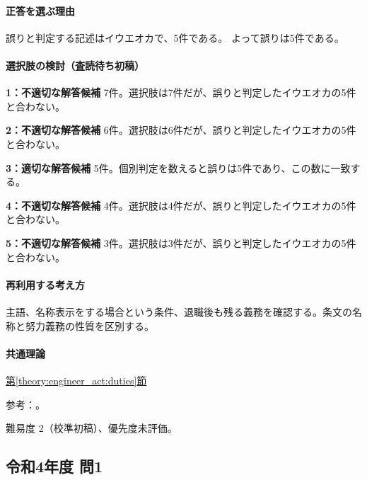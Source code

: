 \paragraph{正答を選ぶ理由} 誤りと判定する記述はイウエオカで、5件である。  よって誤りは5件である。

\paragraph{選択肢の検討（査読待ち初稿）}\mbox{}\par

\noindent\textbf{1：不適切な解答候補} 7件。選択肢は7件だが、誤りと判定したイウエオカの5件と合わない。\par

\noindent\textbf{2：不適切な解答候補} 6件。選択肢は6件だが、誤りと判定したイウエオカの5件と合わない。\par

\noindent\textbf{3：適切な解答候補} 5件。個別判定を数えると誤りは5件であり、この数に一致する。\par

\noindent\textbf{4：不適切な解答候補} 4件。選択肢は4件だが、誤りと判定したイウエオカの5件と合わない。\par

\noindent\textbf{5：不適切な解答候補} 3件。選択肢は3件だが、誤りと判定したイウエオカの5件と合わない。\par

\paragraph{再利用する考え方} 主語、名称表示をする場合という条件、退職後も残る義務を確認する。条文の名称と努力義務の性質を区別する。

\paragraph{共通理論} \hyperref[theory:engineer_act:duties]{第\ref*{theory:engineer_act:duties}節}

\par 参考：\cite{engineer_act_current}。

\par 難易度 2（校準初稿）、優先度未評価。

\subsection{令和4年度 問1}
\label{q:r04-reg-apt-01}

